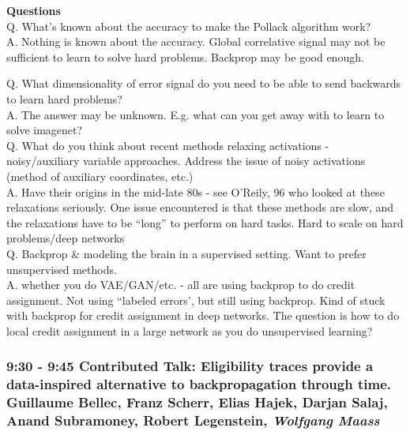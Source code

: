 \documentclass[12pt]{article}
\begin{document}
\textbf{Questions} \\

Q. What's known about the accuracy to make the Pollack algorithm work? \\

A. Nothing is known about the accuracy. Global correlative signal may not be sufficient to learn to solve hard problems. Backprop may be good enough. 

Q. What dimensionality of error signal do you need to be able to send backwards to learn hard problems? \\

A. The answer may be unknown. E.g. what can you get away with to learn to solve imagenet?  \\

Q. What do you think about recent methods relaxing activations - noisy/auxiliary variable approaches. Address the issue of noisy activations (method of auxiliary coordinates, etc.) \\

A. Have their origins in the mid-late 80s - see O'Reily, 96 who looked at these relaxations seriously. One issue encountered is that these methods are slow, and the relaxations have to be ``long'' to perform on hard tasks. Hard to scale on hard problems/deep networks \\

Q. Backprop \& modeling the brain in a supervised setting. Want to prefer unsupervised methods. \\

A. whether you do VAE/GAN/etc. - all are using backprop to do credit assignment. Not using ``labeled errors', but still using backprop. Kind of stuck with backprop for credit assignment in deep networks. The question is how to do local credit assignment in a large network as you do unsupervised learning? \\


\subsubsection{9:30 - 9:45 Contributed Talk: Eligibility traces provide a data-inspired alternative to backpropagation through time. \textbf{Guillaume Bellec}, Franz Scherr, Elias Hajek, Darjan Salaj, Anand Subramoney, Robert Legenstein, \textit{Wolfgang Maass}}
\end{document}
